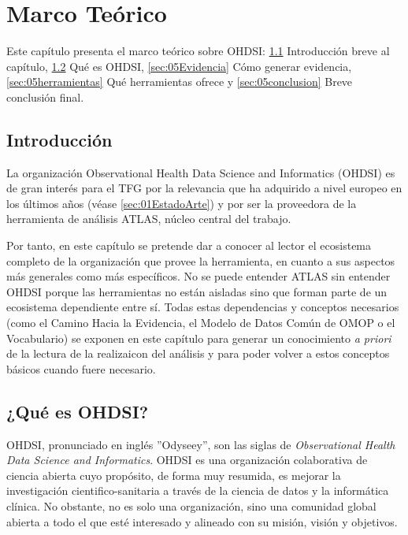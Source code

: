 \chapter{Marco Teórico}\label{cap:05EstudioPrevio}

Este capítulo presenta el marco teórico sobre OHDSI:  \ref{sec:05intro} Introducción breve al capítulo,  \ref{sec:05OHDSI} Qué es OHDSI,  \ref{sec:05Evidencia} Cómo generar evidencia, \ref{sec:05herramientas} Qué herramientas ofrece y \ref{sec:05conclusion} Breve conclusión final.

\section{Introducción} \label{sec:05intro}

La organización Observational Health Data Science and Informatics (OHDSI) es de gran interés para el TFG por la relevancia que ha adquirido a nivel europeo en los últimos años (véase \ref{sec:01EstadoArte}) y por ser la proveedora de la herramienta de análisis ATLAS, núcleo central del trabajo.

Por tanto, en este capítulo se pretende dar a conocer al lector el ecosistema completo de la organización que provee la herramienta, en cuanto a sus aspectos más generales como más específicos. No se puede entender ATLAS sin entender OHDSI porque las herramientas no están aisladas sino que forman parte de un ecosistema dependiente entre sí. Todas estas dependencias y conceptos necesarios (como el Camino Hacia la Evidencia, el Modelo de Datos Común de OMOP o el Vocabulario) se exponen en este capítulo para generar un conocimiento\textit{ a priori} de la lectura de la realizaicon del análisis y para poder volver a estos conceptos básicos cuando fuere necesario.


\section{¿Qué es OHDSI?} \label{sec:05OHDSI}

OHDSI, pronunciado en inglés ''Odyseey'', son las siglas de \textit{Observational Health Data Science and Informatics}. OHDSI es una organización colaborativa de ciencia abierta cuyo propósito, de forma muy resumida, es mejorar la investigación cientifico-sanitaria a través de la ciencia de datos y la informática clínica. No obstante, no es solo una organización, sino una comunidad global abierta a todo el que esté interesado y alineado con su misión, visión y objetivos. 

